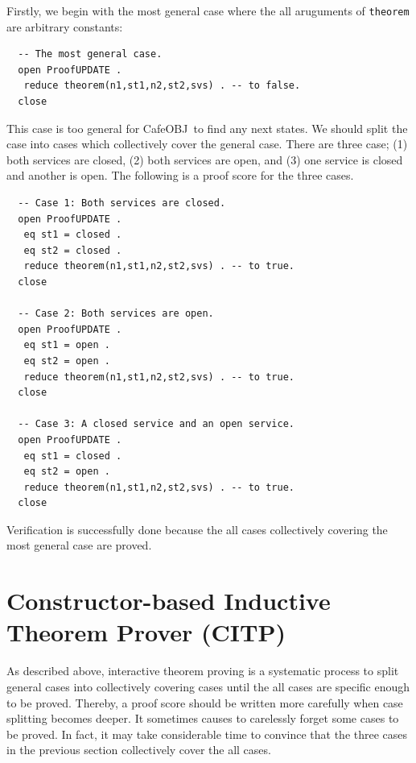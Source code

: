 \documentclass[12pt]{report}
\newcommand{\cafeobj}{{\sf CafeOBJ}~}
\begin{document}
Firstly, we begin with the most general case where the all aruguments of
{\tt theorem} are arbitrary constants:
\small
\begin{verbatim}
  -- The most general case.
  open ProofUPDATE .
   reduce theorem(n1,st1,n2,st2,svs) . -- to false.
  close
\end{verbatim}
\normalsize
This case is too general for \cafeobj to find any next states.
We should split the case into cases which collectively cover
the general case.  There are three case; (1) both services are closed,
(2) both services are open, and (3) one service is closed and another
is open. The following is a proof score for the three cases.
\small
\begin{verbatim}
  -- Case 1: Both services are closed.
  open ProofUPDATE .
   eq st1 = closed .
   eq st2 = closed .
   reduce theorem(n1,st1,n2,st2,svs) . -- to true.
  close
  
  -- Case 2: Both services are open.
  open ProofUPDATE .
   eq st1 = open .
   eq st2 = open .
   reduce theorem(n1,st1,n2,st2,svs) . -- to true.
  close
  
  -- Case 3: A closed service and an open service.
  open ProofUPDATE .
   eq st1 = closed .
   eq st2 = open .
   reduce theorem(n1,st1,n2,st2,svs) . -- to true.
  close
\end{verbatim}
\normalsize
Verification is successfully done because the all cases collectively covering
the most general case are proved.
\section{Constructor-based Inductive Theorem Prover (CITP)}
\label{sec:CITP}
As described above, interactive theorem proving is a systematic
process to split general cases into collectively covering cases until the
all cases are specific enough to be proved. Thereby, a proof score should
be written more carefully when case splitting becomes deeper. It
sometimes causes to carelessly forget some cases to be proved. In
fact, it may take considerable time to convince that the three cases in
the previous section collectively cover the all cases.
\end{document}

